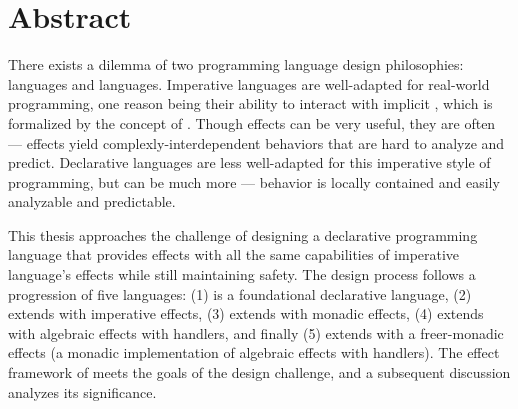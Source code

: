 \chapter*{Abstract}
There exists a dilemma of two programming language design philosophies:  languages and  languages.
Imperative languages are well-adapted for real-world programming, one reason being their ability to interact with implicit , which is formalized by the concept of .
Though effects can be very useful, they are often  --- effects yield complexly-interdependent behaviors that are hard to analyze and predict.
Declarative languages are less well-adapted for this imperative style of programming, but can be much more  --- behavior is locally contained and easily analyzable and predictable.

This thesis approaches the challenge of designing a declarative programming language that provides effects with all the same capabilities of imperative language's effects while still maintaining safety.
The design process follows a progression of five languages:
(1) \LangA is a foundational declarative language,
(2) \LangB extends \LangA with imperative effects,
(3) \LangC extends \LangA with monadic effects,
(4) \LangD extends \LangA with algebraic effects with handlers, and finally
(5) \LangE extends \LangC with a freer-monadic effects (a monadic implementation of algebraic effects with handlers).
The effect framework of \LangE meets the goals of the design challenge, and a subsequent discussion analyzes its significance.
